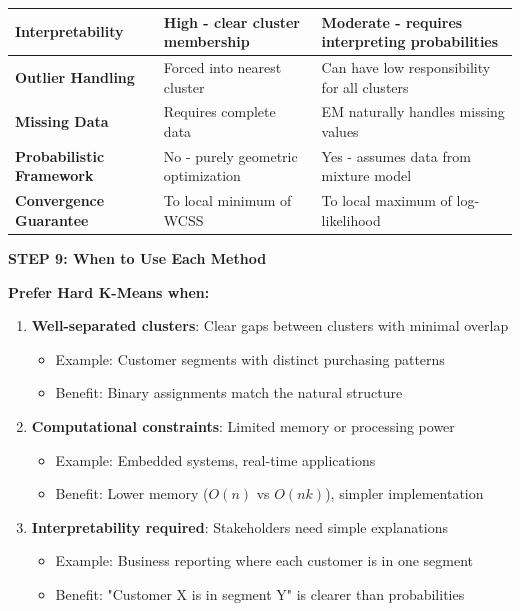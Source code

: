 \documentclass[12pt]{article}
\begin{document}
\begin{solution}
\begin{center}
\begin{tabular}{p{3cm}|p{5cm}|p{5cm}}
\hline
\textbf{Interpretability} & High - clear cluster membership & Moderate - requires interpreting probabilities \\
\hline
\textbf{Outlier Handling} & Forced into nearest cluster & Can have low responsibility for all clusters \\
\hline
\textbf{Missing Data} & Requires complete data & EM naturally handles missing values \\
\hline
\textbf{Probabilistic Framework} & No - purely geometric optimization & Yes - assumes data from mixture model \\
\hline
\textbf{Convergence Guarantee} & To local minimum of WCSS & To local maximum of log-likelihood \\
\end{tabular}
\end{center}

\textbf{STEP 9: When to Use Each Method}

\textbf{Prefer Hard K-Means when:}

\begin{enumerate}
    \item \textbf{Well-separated clusters}: Clear gaps between clusters with minimal overlap
    \begin{itemize}
        \item Example: Customer segments with distinct purchasing patterns
        \item Benefit: Binary assignments match the natural structure
    \end{itemize}

    \item \textbf{Computational constraints}: Limited memory or processing power
    \begin{itemize}
        \item Example: Embedded systems, real-time applications
        \item Benefit: Lower memory ($O(n)$ vs $O(nk)$), simpler implementation
    \end{itemize}

    \item \textbf{Interpretability required}: Stakeholders need simple explanations
    \begin{itemize}
        \item Example: Business reporting where each customer is in one segment
        \item Benefit: "Customer X is in segment Y" is clearer than probabilities
    \end{itemize}


\end{enumerate}
\end{solution}
\end{document}
